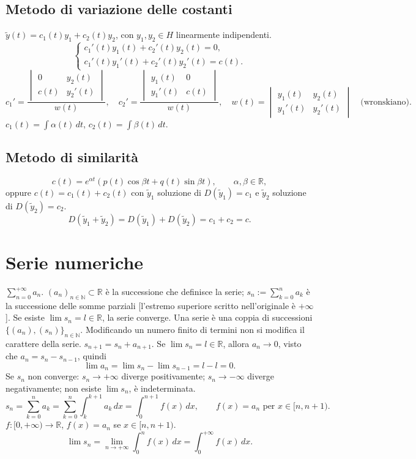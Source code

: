 \documentclass[11pt,a4paper]{article}
\newcommand{\R}{\mathbb R}\newcommand{\N}{\mathbb N}\newcommand{\pagina}[1]{\clearpage}
\begin{document}
\subsection*{Metodo di variazione delle costanti}
$\widetilde y(t)=c_1(t)y_1+c_2(t)y_2$, con $y_1,y_2\in H$ linearmente indipendenti.
\[\begin{cases}c_1'(t)y_1(t)+c_2'(t)y_2(t)=0,\\c_1'(t)y_1'(t)+c_2'(t)y_2'(t)=c(t).\end{cases}\]
\[c_1'=\frac{\begin{vmatrix}0&y_2(t)\\c(t)&y_2'(t)\end{vmatrix}}{w(t)},\quad
c_2'=\frac{\begin{vmatrix}y_1(t)&0\\y_1'(t)&c(t)\end{vmatrix}}{w(t)},\quad
w(t)=\begin{vmatrix}y_1(t)&y_2(t)\\y_1'(t)&y_2'(t)\end{vmatrix}\quad\text{(wronskiano)}.\]
$c_1(t)=\int\alpha(t)\,dt$, $c_2(t)=\int\beta(t)\,dt$.
\subsection*{Metodo di similarità}
\[c(t)=e^{\alpha t}(p(t)\cos\beta t+q(t)\sin\beta t),\qquad\alpha,\beta\in\R,\]
oppure $c(t)=c_1(t)+c_2(t)$ con $\widetilde y_1$ soluzione di $D(\widetilde y_1)=c_1$ e $\widetilde y_2$ soluzione di $D(\widetilde y_2)=c_2$.
\[D(\widetilde y_1+\widetilde y_2)=D(\widetilde y_1)+D(\widetilde y_2)=c_1+c_2=c.\]
\pagina{54}
\section*{Serie numeriche}
$\sum_{n=0}^{+\infty}a_n$. $(a_n)_{n\in\N}\subset\R$ è la successione che definisce la serie; $s_n:=\sum_{k=0}^na_k$ è la successione delle somme parziali [l'estremo superiore scritto nell'originale è $+\infty$]. Se esiste $\lim s_n=l\in\R$, la serie converge. Una serie è una coppia di successioni $\{(a_n),(s_n)\}_{n\in\N}$.
Modificando un numero finito di termini non si modifica il carattere della serie. $s_{n+1}=s_n+a_{n+1}$. Se $\lim s_n=l\in\R$, allora $a_n\to0$, visto che $a_n=s_n-s_{n-1}$, quindi
\[\lim a_n=\lim s_n-\lim s_{n-1}=l-l=0.\]
Se $s_n$ non converge: $s_n\to+\infty$ diverge positivamente; $s_n\to-\infty$ diverge negativamente; non esiste $\lim s_n$, è indeterminata.
\[s_n=\sum_{k=0}^na_k=\sum_{k=0}^n\int_k^{k+1}a_k\,dx=\int_0^{n+1}f(x)\,dx,\qquad f(x)=a_n\text{ per }x\in[n,n+1).\]
\pagina{55}
$f:[0,+\infty)\to\R$, $f(x)=a_n$ se $x\in[n,n+1)$.
\[\lim s_n=\lim_{n\to+\infty}\int_0^n f(x)\,dx=\int_0^{+\infty}f(x)\,dx.\]
\end{document}
